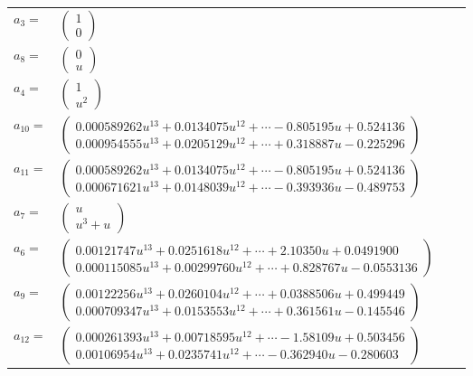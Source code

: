 \documentclass[1p]{elsarticle_modified}
\theoremstyle{definition}
\begin{document}
\begin{tabular}{m{7pt} m{180pt} m{7pt} m{180pt} }
\flushright $a_{3}=$&$\begin{pmatrix}1\\0\end{pmatrix}$ \\
\flushright $a_{8}=$&$\begin{pmatrix}0\\u\end{pmatrix}$ \\
\flushright $a_{4}=$&$\begin{pmatrix}1\\u^2\end{pmatrix}$ \\
\flushright $a_{10}=$&$\begin{pmatrix}0.000589262 u^{13}+0.0134075 u^{12}+\cdots-0.805195 u+0.524136\\0.000954555 u^{13}+0.0205129 u^{12}+\cdots+0.318887 u-0.225296\end{pmatrix}$ \\
\flushright $a_{11}=$&$\begin{pmatrix}0.000589262 u^{13}+0.0134075 u^{12}+\cdots-0.805195 u+0.524136\\0.000671621 u^{13}+0.0148039 u^{12}+\cdots-0.393936 u-0.489753\end{pmatrix}$ \\
\flushright $a_{7}=$&$\begin{pmatrix}u\\u^3+u\end{pmatrix}$ \\
\flushright $a_{6}=$&$\begin{pmatrix}0.00121747 u^{13}+0.0251618 u^{12}+\cdots+2.10350 u+0.0491900\\0.000115085 u^{13}+0.00299760 u^{12}+\cdots+0.828767 u-0.0553136\end{pmatrix}$ \\
\flushright $a_{9}=$&$\begin{pmatrix}0.00122256 u^{13}+0.0260104 u^{12}+\cdots+0.0388506 u+0.499449\\0.000709347 u^{13}+0.0153553 u^{12}+\cdots+0.361561 u-0.145546\end{pmatrix}$ \\
\flushright $a_{12}=$&$\begin{pmatrix}0.000261393 u^{13}+0.00718595 u^{12}+\cdots-1.58109 u+0.503456\\0.00106954 u^{13}+0.0235741 u^{12}+\cdots-0.362940 u-0.280603\end{pmatrix}$ \\

\end{tabular}
\end{document}
